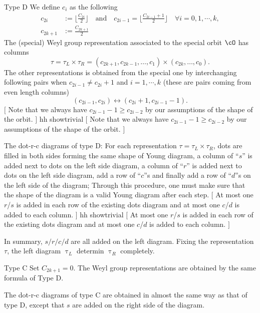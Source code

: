 \documentclass[12pt,a4paper]{amsart}
\newcommand{\trivial}[2][]{\if\relax\detokenize{#1}\relax
  {%
      \color{orange} \vspace{0em} $[$  #2 $]$
      \color{black}
  }
  \else
\ifx#1h
\ifcsname showtrivial\endcsname
{%
    \color{orange} \vspace{0em}  $[$ #2 $]$
    \color{black}
}
\fi
\else {\red Wrong argument!} \fi
\fi
}
\numberwithin{equation}{section}
\theoremstyle{remark}
\def\floor#1{{\lfloor #1 \rfloor}}
\begin{document}
\begin{des}
  \item[Type D] We define $c_{i}$ as the following
  \[
    \begin{split}
      c_{2i} & := \floor{\frac{C_{2i}}{2}} \quad \text{and}\quad c_{2i-1} =\floor{\frac{C_{2i-1}+1}{2}}
      \quad \forall i=0,1, \cdots, k,\\
      c_{2k+1} & := \frac{C_{2k+1}}{2}
    \end{split}
  \]
  The (special) Weyl group representation associated to the special orbit $\cO$
  has columns
  \[
    \tau = \tau_L\times\tau_R=(c_{2k+1},c_{2k-1},\dots , c_1)\times (c_{2k},\dots ,c_0).
  \]
  The other representations is obtained from the special one by interchanging
  following pairs when $c_{2i-1}\neq c_{2i}+1$ and $i=1, \cdots, k$ (these are
  pairs coming from even length columns)
  \[
    (c_{2i-1},c_{2i} )\longleftrightarrow (c_{2i}+1,c_{2i-1}-1).
  \]
  \trivial[h]{ Note that we always have $c_{2i-1}-1 \geq c_{2i-2}$ by our
    assumptions of the shape of the orbit. }

  The dot-r-c diagrams of type D: For each representation
  $\tau = \tau_L\times \tau_R$, dots are filled in both sides forming the same
  shape of Young diagram, a column of ``$s$'' is added next to dots on the left
  side diagram, a column of ``$r$'' is added next to dots on the left side
  diagram, add a row of ``$c$''s and finally add a row of ``$d$''s on the left
  side of the diagram; Through this procedure, one must make sure that the shape
  of the diagram is a valid Young diagram after each step. \trivial[h]{At most
    one $r$/$s$ is added in each row of the existing dots diagram and at most
    one $c$/$d$ is added to each column.}

  In summary, $s/r/c/d$ are all added on the left diagram.
  Fixing the representation $\tau$, the left diagram $\uptau_{L}$ determin
  $\uptau_{R}$ completely.

  \item[Type C] Set $C_{2k+1}=0$. The Weyl group representations are obtained by
  the same formula of Type D.

  The dot-r-c diagrams of type C are obtained in almost the same way as that of
  type D, except that $s$ are added on the right side of the diagram.


\end{des}
\end{document}
